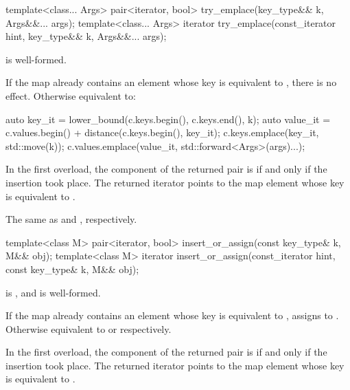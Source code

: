\begin{codeblock}
\begin{codeblock}
\begin{codeblock}
\begin{addedblock}
%
\begin{itemdecl}
template<class... Args>
  pair<iterator, bool> try_emplace(key_type&& k, Args&&... args);
template<class... Args>
  iterator try_emplace(const_iterator hint, key_type&& k, Args&&... args);
\end{itemdecl}

\begin{itemdescr}
\pnum \constraints {} is well-formed.

\pnum
\effects
If the map already contains an element whose key is equivalent to ,
there is no effect.  Otherwise equivalent to:
\begin{codeblock}
auto key_it = lower_bound(c.keys.begin(), c.keys.end(), k);
auto value_it = c.values.begin() + distance(c.keys.begin(), key_it);
c.keys.emplace(key_it, std::move(k));
c.values.emplace(value_it, std::forward<Args>(args)...);
\end{codeblock}

\pnum
\returns
In the first overload,
the  component of the returned pair is 
if and only if the insertion took place.
The returned iterator points to the map element
whose key is equivalent to .

\pnum
\complexity
The same as  and ,
respectively.
\end{itemdescr}

%
\begin{itemdecl}
template<class M>
  pair<iterator, bool> insert_or_assign(const key_type& k, M&& obj);
template<class M>
  iterator insert_or_assign(const_iterator hint, const key_type& k, M&& obj);
\end{itemdecl}

\begin{itemdescr}
\pnum \constraints {} is , and
 is well-formed.

\pnum
\effects
If the map already contains an element  whose key is equivalent
to , assigns  to .
Otherwise equivalent to  or
 respectively.

\pnum
\returns
In the first overload,
the  component of the returned pair is 
if and only if the insertion took place.
The returned iterator points to the map element
whose key is equivalent to .


\end{itemdescr}
\end{addedblock}
\end{codeblock}
\end{codeblock}
\end{codeblock}
